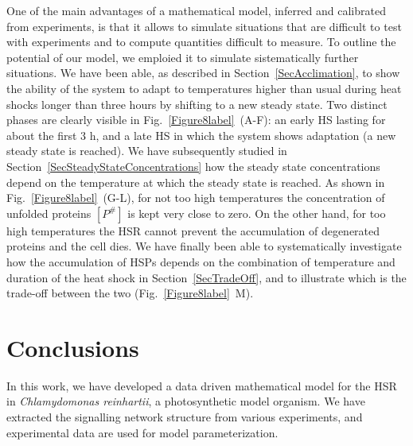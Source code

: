 \documentclass[oneside, 10pt, a4paper, twocolumn]{article}
\begin{document}
One of the main advantages of a mathematical model, inferred and calibrated from experiments, is that it allows to simulate situations that are difficult to test with experiments and to compute quantities difficult to measure. To outline the potential of our model, we emploied it to simulate sistematically further situations. 
We have been able, as described in Section~\ref{SecAcclimation}, to show the ability of the system to adapt to temperatures higher than usual during heat shocks longer than three hours by shifting to a new steady state. Two distinct phases are clearly visible in Fig.~\ref{Figure8label}~(A-F): an early HS lasting for about the first $3$ h, and a late HS in which the system shows adaptation (a new steady state is reached). 
We have subsequently studied in Section~\ref{SecSteadyStateConcentrations} how the steady state concentrations depend on the temperature at which the steady state is reached. As shown in Fig.~\ref{Figure8label}~(G-L), for not too high temperatures the concentration of unfolded proteins $\left[P^\#\right]$ is kept very close to zero. On the other hand, for too high temperatures the HSR cannot prevent the accumulation of degenerated proteins and the cell dies. 
We have finally been able to systematically investigate how the accumulation of HSPs depends on the combination of temperature and duration of the heat shock in Section~\ref{SecTradeOff}, and to illustrate which is the trade-off between the two (Fig.~\ref{Figure8label}~M). 






\section{Conclusions}
\label{SectionConclusions}

In this work, we have developed a data driven mathematical model for the HSR in \emph{Chlamydomonas reinhartii}, a photosynthetic model organism. We have extracted the signalling network structure from various experiments, and experimental data are used for model parameterization.
\end{document}
